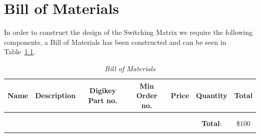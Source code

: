 \documentclass[12pt,openany,a4paper]{book}
\newcommand{\tab}[1]  {Table~\ref{#1}}		%
\begin{document}
\chapter{Bill of Materials}
In order to construct the design of the Switching Matrix we require the following components, a Bill of Materials has been constructed and can be seen in \tab{tab:bom}.
\begin{longtable}{|c|c|c|c|c|c|c|}
\hline
Name & Description & Digikey Part no. & Min Order no. & Price & Quantity & Total \\
\hline
& & & & & & \\
\hline
\multicolumn{7}{c}{} \\
\hline
\multicolumn{5}{|c}{} & \textbf{Total}: & \$$100$\\
\hline
\caption{\sl Bill of Materials}
\label{tab:bom}
\end{longtable}
\end{document}
